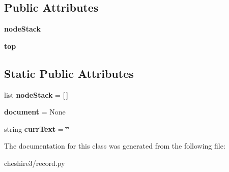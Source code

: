 \subsection*{Public Attributes}
\begin{DoxyCompactItemize}
\item 
\hypertarget{classcheshire3_1_1record_1_1_sax_to_dom_handler_ab12e9d1893d28e9a79d97e9f50b587a3}{{\bfseries node\-Stack}}\label{classcheshire3_1_1record_1_1_sax_to_dom_handler_ab12e9d1893d28e9a79d97e9f50b587a3}

\item 
\hypertarget{classcheshire3_1_1record_1_1_sax_to_dom_handler_a3f67fcd9cc8e29a53bf46c80a593ce1f}{{\bfseries top}}\label{classcheshire3_1_1record_1_1_sax_to_dom_handler_a3f67fcd9cc8e29a53bf46c80a593ce1f}

\end{DoxyCompactItemize}
\subsection*{Static Public Attributes}
\begin{DoxyCompactItemize}
\item 
\hypertarget{classcheshire3_1_1record_1_1_sax_to_dom_handler_a0991fbf63c4ce052f2f17fb71f41214b}{list {\bfseries node\-Stack} = \mbox{[}$\,$\mbox{]}}\label{classcheshire3_1_1record_1_1_sax_to_dom_handler_a0991fbf63c4ce052f2f17fb71f41214b}

\item 
\hypertarget{classcheshire3_1_1record_1_1_sax_to_dom_handler_a25e934db091599a37da902b92c3fcbf5}{{\bfseries document} = None}\label{classcheshire3_1_1record_1_1_sax_to_dom_handler_a25e934db091599a37da902b92c3fcbf5}

\item 
\hypertarget{classcheshire3_1_1record_1_1_sax_to_dom_handler_a4087bb85e64e9df9d21047ed4c33fc5d}{string {\bfseries curr\-Text} = \char`\"{}\char`\"{}}\label{classcheshire3_1_1record_1_1_sax_to_dom_handler_a4087bb85e64e9df9d21047ed4c33fc5d}

\end{DoxyCompactItemize}


The documentation for this class was generated from the following file\-:\begin{DoxyCompactItemize}
\item 
cheshire3/record.\-py\end{DoxyCompactItemize}
